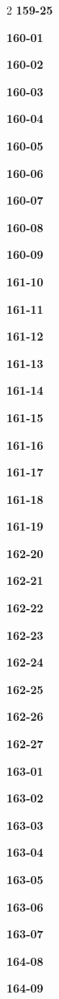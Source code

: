 \documentclass[10pt,a4paper]{article}
\begin{document}
\begin{multicols}{2}
\noindent\textbf{159-25}\ \par
\noindent\textbf{160-01}\ \par
\noindent\textbf{160-02}\ \par
\noindent\textbf{160-03}\ \par
\noindent\textbf{160-04}\ \par
\noindent\textbf{160-05}\ \par
\noindent\textbf{160-06}\ \par
\noindent\textbf{160-07}\ \par
\noindent\textbf{160-08}\ \par
\noindent\textbf{160-09}\ \par
\noindent\textbf{161-10}\ \par
\noindent\textbf{161-11}\ \par
\noindent\textbf{161-12}\ \par
\noindent\textbf{161-13}\ \par
\noindent\textbf{161-14}\ \par
\noindent\textbf{161-15}\ \par
\noindent\textbf{161-16}\ \par
\noindent\textbf{161-17}\ \par
\noindent\textbf{161-18}\ \par
\noindent\textbf{161-19}\ \par
\noindent\textbf{162-20}\ \par
\noindent\textbf{162-21}\ \par
\noindent\textbf{162-22}\ \par
\noindent\textbf{162-23}\ \par
\noindent\textbf{162-24}\ \par
\noindent\textbf{162-25}\ \par
\noindent\textbf{162-26}\ \par
\noindent\textbf{162-27}\ \par
\noindent\textbf{163-01}\ \par
\noindent\textbf{163-02}\ \par
\noindent\textbf{163-03}\ \par
\noindent\textbf{163-04}\ \par
\noindent\textbf{163-05}\ \par
\noindent\textbf{163-06}\ \par
\noindent\textbf{163-07}\ \par
\noindent\textbf{164-08}\ \par
\noindent\textbf{164-09}\ \par

\end{multicols}
\end{document}
